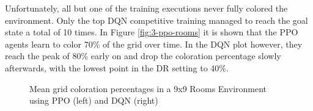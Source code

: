 Unfortunately, all but one of the training executions never fully colored the environment. Only the top DQN competitive training managed to reach the goal state a total of 10 times. In Figure \ref{fig:3-ppo-rooms} it is shown that the PPO agents learn to color 70\% of the grid over time. In the DQN plot however, they reach the peak of 80\% early on and drop the coloration percentage slowly afterwards, with the lowest point in the DR setting to 40\%.  

\begin{figure}[hpbt]
    \centering
    \hspace{0.01\textwidth}
    \caption[Mean Coloration Percentage of the Top Modes in a Rooms Environment]{Mean grid coloration percentages in a 9x9 Rooms Environment using PPO (left) and DQN (right)}
    \label{fig:multipic_plots_rooms} %
\end{figure}